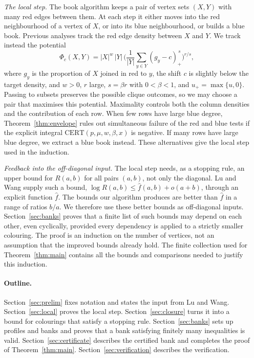 \documentclass[11pt]{article}
\theoremstyle{definition}
\theoremstyle{remark}
\newcommand{\fh}{\widehat f}
\newcommand{\cert}{\mathrm{CERT}}
\begin{document}
\emph{The local step.} The book algorithm keeps a pair of vertex sets $(X,Y)$ with many red edges between them. At
each step it either moves into the red neighbourhood of a vertex of $X$, or into its blue neighbourhood, or builds a
blue book. Previous analyses track the red edge density between $X$ and $Y$. We track instead the potential
\[
\Phi_c(X,Y)=|X|^w\,|Y|\,\Big(\frac1{|Y|}\sum_{y\in Y}(g_y-c)_+^{\,s}\Big)^{r/s},
\]
where $g_y$ is the proportion of $X$ joined in red to $y$, the shift $c$ is slightly below the target density, and
$w>0$, $r$ large, $s=\beta r$ with $0<\beta<1$, and $u_+=\max\{u,0\}$. Passing to subsets preserves the possible
clique outcomes, so we may choose a pair that maximises this potential. Maximality controls both the column
densities and the contribution of each row. When few rows have large blue degree,
Theorem~\ref{thm:envelope} rules out simultaneous failure of the red and blue tests if the explicit integral
$\cert(p,\mu,w,\beta,x)$ is negative. If many rows have large blue degree, we extract a blue book instead.
These alternatives give the local step used in the induction.

\emph{Feedback into the off-diagonal input.} The local step needs, as a stopping rule, an upper bound for $R(a,b)$
for all pairs $(a,b)$, not only the diagonal. Lu and Wang supply such a bound, $\log R(a,b)\le \fh(a,b)+o(a+b)$, through
an explicit function $\fh$. The bounds our algorithm produces are better than $\fh$ in a range of ratios $b/a$. We
therefore use these better bounds as off-diagonal inputs. Section~\ref{sec:banks} proves that a finite list of
such bounds may depend on each other, even cyclically, provided every dependency is applied to a strictly smaller
colouring. The proof is an induction on the number of vertices, not an assumption that the improved bounds already
hold. The finite collection used for Theorem~\ref{thm:main} contains all the bounds and comparisons needed to
justify this induction.

\paragraph{Outline.} Section~\ref{sec:prelim} fixes notation and states the input from Lu and Wang.
Section~\ref{sec:local} proves the local step. Section~\ref{sec:closure} turns it into a bound for colourings that
satisfy a stopping rule. Section~\ref{sec:banks} sets up profiles and banks and proves that a bank satisfying finitely
many inequalities is valid. Section~\ref{sec:certificate} describes the certified bank and completes the proof of
Theorem~\ref{thm:main}. Section~\ref{sec:verification} describes the verification.
\end{document}
